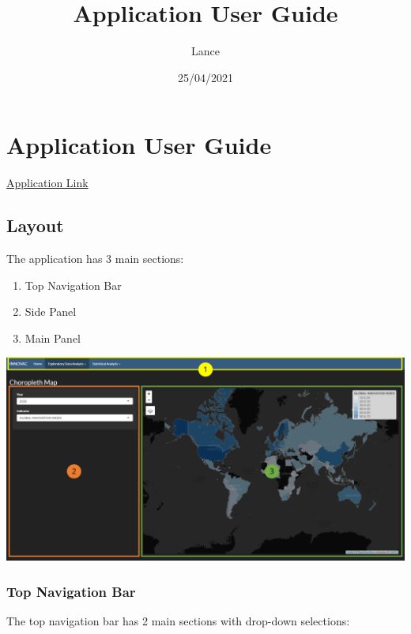 \documentclass[
]{article}
\title{Application User Guide}
\author{Lance}
\date{25/04/2021}
\providecommand{\tightlist}{%
  \setlength{\itemsep}{0pt}\setlength{\parskip}{0pt}}
\begin{document}
\maketitle

\hypertarget{application-user-guide}{%
\section{Application User Guide}\label{application-user-guide}}

\href{https://lanceteo89.shinyapps.io/INNOVAC/}{Application Link}

\hypertarget{layout}{%
\subsection{Layout}\label{layout}}

The application has 3 main sections:

\begin{enumerate}
\def\labelenumi{\arabic{enumi}.}
\tightlist
\item
  Top Navigation Bar
\item
  Side Panel
\item
  Main Panel
\end{enumerate}

\includegraphics{./images/layout.png}

\hypertarget{top-navigation-bar}{%
\subsubsection{Top Navigation Bar}\label{top-navigation-bar}}

The top navigation bar has 2 main sections with drop-down selections:
\end{document}
